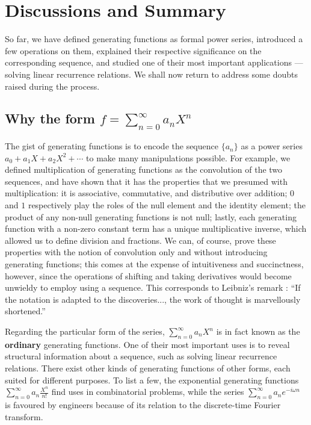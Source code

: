 \documentclass[a4paper, 12pt]{report}
\begin{document}
{\let\clearpage\relax\chapter{Discussions and Summary}\label{ch:conclusion}}
% 

So far, we have defined generating functions as formal power series, introduced a few operations on them, explained their respective significance on the corresponding sequence, and studied one of their most important applications --- solving linear recurrence relations. We shall now return to address some doubts raised during the process.

\section{Why the form \texorpdfstring{$f = \sum_{n = 0}^\infty a_n X^n$}}

The gist of generating functions is to encode the sequence $\{a_n\}$ as a power series $a_0 + a_1 X + a_2 X^2 + \cdots$ to make many manipulations possible. For example, we defined multiplication of generating functions as the convolution of the two sequences, and have shown that it has the properties that we presumed with multiplication: it is associative, commutative, and distributive over addition; $0$ and $1$ respectively play the roles of the null element and the identity element; the product of any non-null generating functions is not null; lastly, each generating function with a non-zero constant term has a unique multiplicative inverse, which allowed us to define division and fractions. We can, of course, prove these properties with the notion of convolution only and without introducing generating functions; this comes at the expense of intuitiveness and succinctness, however, since the operations of shifting and taking derivatives would become unwieldy to employ using a sequence. This corresponds to Leibniz's remark \autocite[1]{zorich}: ``If the notation is adapted to the discoveries..., the work of thought is marvellously shortened.'' 

Regarding the particular form of the series, $\sum_{n = 0}^\infty a_n X^n$ is in fact known as the \textbf{ordinary} generating functions. One of their most important uses is to reveal structural information about a sequence, such as solving linear recurrence relations. There exist other kinds of generating functions of other forms, each suited for different purposes. To list a few, the exponential generating functions $\sum_{n = 0}^\infty a_n \frac{X^n}{n!}$ find uses in combinatorial problems, while the series $\sum_{n = 0}^\infty a_n e^{-i\omega n}$ is favoured by engineers because of its relation to the discrete-time Fourier transform.
\end{document}
